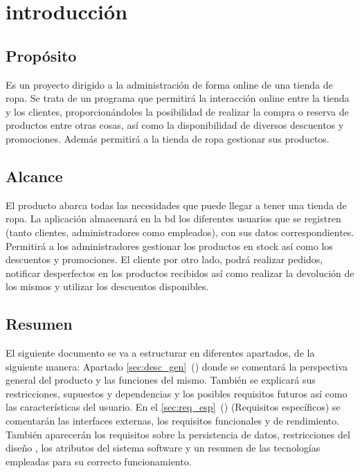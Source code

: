 \section{introducción}
\subsection{Propósito}
Es un proyecto dirigido a la administración de forma online de una tienda de ropa. Se trata de un programa que permitirá la interacción online entre la tienda y los clientes, proporcionándoles la posibilidad de realizar la compra o reserva de productos entre otras cosas, así como la disponibilidad de diversos descuentos y promociones.
Además permitirá a la tienda de ropa gestionar sus productos.
\subsection{Alcance}
El producto abarca todas las necesidades que puede llegar a tener una tienda de ropa. La aplicación almacenará en la \gls{bd} los diferentes usuarios que se registren (tanto clientes, administradores como empleados), con sus datos correspondientes.
Permitirá a los administradores gestionar los productos en stock así como los descuentos y promociones. El cliente por otro lado, podrá realizar pedidos, notificar desperfectos en los productos recibidos así como realizar la devolución de los mismos y utilizar los descuentos disponibles.

\glsaddall
\nocite{*}
{
    \printglossary[title=Definiciones\, acrónimos y abreviaturas, numberedsection]}



\subsection{Resumen}
El siguiente documento se va a estructurar en diferentes apartados, de la siguiente manera: Apartado \ref{sec:desc_gen}~() donde se comentará la perspectiva general del producto y las funciones del mismo. También se explicará sus restricciones, supuestos y dependencias y los posibles requisitos futuros así como las características del usuario.
En el \ref{sec:req_esp}~() (Requisitos específicos) se comentarán las interfaces externas, los requisitos funcionales y de rendimiento. También aparecerán los requisitos sobre la persistencia de datos, restricciones del diseño , los atributos del sistema software y un resumen de las tecnologías empleadas para su correcto funcionamiento.
